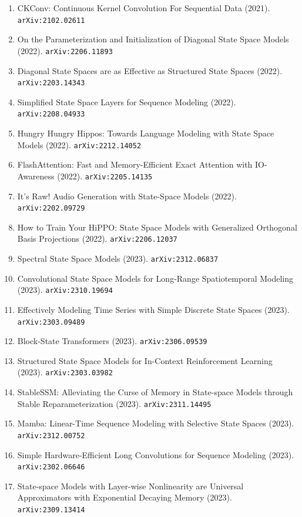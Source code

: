 \documentclass[11pt]{article}
\begin{document}
\begin{enumerate}
  Linear State-Space Layers (2021). \texttt{arXiv:2110.13985}
  \item CKConv: Continuous Kernel Convolution For Sequential Data (2021). \texttt{arXiv:2102.02611}
  \item On the Parameterization and Initialization of Diagonal State Space
  Models (2022). \texttt{arXiv:2206.11893}
  \item Diagonal State Spaces are as Effective as Structured State Spaces (2022). \texttt{arXiv:2203.14343}
  \item Simplified State Space Layers for Sequence Modeling (2022). \texttt{arXiv:2208.04933}
  \item Hungry Hungry Hippos: Towards Language Modeling with State Space Models (2022). \texttt{arXiv:2212.14052}
  \item FlashAttention: Fast and Memory-Efficient Exact Attention with
  IO-Awareness (2022). \texttt{arXiv:2205.14135}
  \item It's Raw! Audio Generation with State-Space Models (2022). \texttt{arXiv:2202.09729}
  \item How to Train Your HiPPO: State Space Models with Generalized Orthogonal
  Basis Projections (2022). \texttt{arXiv:2206.12037}
  \item Spectral State Space Models (2023). \texttt{arXiv:2312.06837}
  \item Convolutional State Space Models for Long-Range Spatiotemporal Modeling (2023). \texttt{arXiv:2310.19694}
  \item Effectively Modeling Time Series with Simple Discrete State Spaces (2023). \texttt{arXiv:2303.09489}
  \item Block-State Transformers (2023). \texttt{arXiv:2306.09539}
  \item Structured State Space Models for In-Context Reinforcement Learning (2023). \texttt{arXiv:2303.03982}
  \item StableSSM: Alleviating the Curse of Memory in State-space Models through
  Stable Reparameterization (2023). \texttt{arXiv:2311.14495}
  \item Mamba: Linear-Time Sequence Modeling with Selective State Spaces (2023). \texttt{arXiv:2312.00752}
  \item Simple Hardware-Efficient Long Convolutions for Sequence Modeling (2023). \texttt{arXiv:2302.06646}
  \item State-space Models with Layer-wise Nonlinearity are Universal
  Approximators with Exponential Decaying Memory (2023). \texttt{arXiv:2309.13414}

\end{enumerate}
\end{document}
